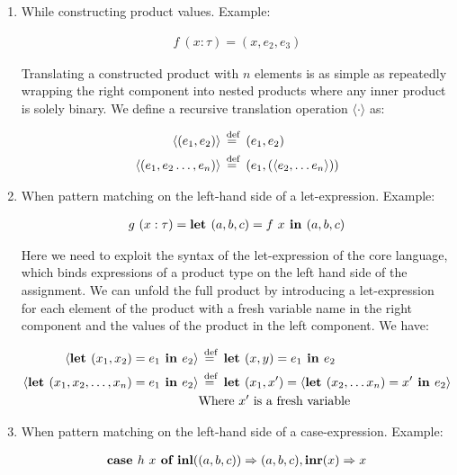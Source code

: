 \begin{enumerate}

  \item While constructing product values. Example:

    \begin{align*}
      f~(x: \tau) = (x, e_2, e_3)
    \end{align*}

    Translating a constructed product with $n$ elements is as simple as
    repeatedly wrapping the right component into nested products where any
    inner product is solely binary. We define a recursive translation operation
    $\langle \cdot \rangle$ as:

    \begin{align*}
      \langle (e_1, e_2) \rangle &\stackrel{\>\text{def}}{=}\> (e_1, e_2) \\
      \langle (e_1, e_2 \dots, e_n) \rangle &\stackrel{\>\text{def}}{=}\> (e_1, (\langle e_2, \dots e_n \rangle))
    \end{align*}

  \item When pattern matching on the left-hand side of a let-expression. Example:

    \begin{align*}
      g~(x: \tau) = \textbf{let } (a, b, c) = f~x \textbf{ in } (a, b, c)
    \end{align*}

    Here we need to exploit the syntax of the let-expression of the core
    language, which binds expressions of a product type on the left hand side
    of the assignment. We can unfold the full product by introducing a
    let-expression for each element of the product with a fresh variable name
    in the right component and the values of the product in the left component.
    We have:

    \begin{align*}
      \langle \textbf{let } (x_1, x_2) = e_1 \textbf{ in } e_2 \rangle &\stackrel{\>\text{def}}{=}\> \textbf{let } (x, y) = e_1 \textbf{ in } e_2 \\
      \langle \textbf{let } (x_1, x_2, \dots, x_n) = e_1 \textbf{ in } e_2 \rangle &\stackrel{\>\text{def}}{=}\> \textbf{let }(x_1, x') = \langle \textbf{let } (x_2, \dots x_n) = x' \textbf{ in } e_2 \rangle \\
        &\text{Where $x'$ is a fresh variable}
    \end{align*}

  \item When pattern matching on the left-hand side of a case-expression.
    Example:

    \begin{align*}
      \textbf{case } h~x \textbf{ of } \textbf{inl}((a, b, c)) \Rightarrow (a, b, c), \textbf{inr}(x) \Rightarrow x
    \end{align*}


\end{enumerate}
